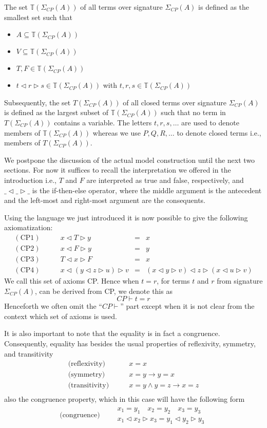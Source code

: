 \documentclass[a4paper,twoside,openright]{report}
\newcommand{\sig}{\ensuremath{\Sigma_{CP}(A)}}
\newcommand{\CP}[1]{\ensuremath{\mathrm{CP#1}}}
\newcommand{\lef}{\ensuremath{\triangleleft}}
\newcommand{\rig}{\ensuremath{\triangleright}}
\begin{document}
The set $\mathbb{T}(\sig)$ of all terms over signature $\sig$ is defined as the smallest set such that
\begin{itemize}
\item $A\subseteq \mathbb{T}(\sig)$
\item $V\subseteq \mathbb{T}(\sig)$
\item $T,F\in \mathbb{T}(\sig)$
\item $t\lef r\rig s\in \mathbb{T}(\sig)$ with $t,r,s\in\mathbb{T}(\sig)$
\end{itemize}
Subsequently, the set $T(\sig)$ of all closed terms over signature $\sig$ is defined as the largest subset of $\mathbb{T}(\sig)$ such that no term in $T(\sig)$ contains a variable. The letters $t, r, s,\ldots$ are used to denote members of $\mathbb{T}(\sig)$ whereas we use $P, Q, R,\ldots$ to denote closed terms i.e., members of $T(\sig)$.

We postpone the discussion of the actual model construction until the next two sections. For now it suffices to recall the interpretation we offered in the introduction i.e., $T$ and $F$ are interpreted as true and false, respectively, and $\_\lef\_\rig\_$ is the if-then-else operator, where the middle argument is the antecedent and the left-most and right-most argument are the consequents.





Using the language we just introduced it is now possible to give the following axiomatization:
\[
\begin{array}{lrcl}
(\CP1)\qquad& x\lef T\rig y &=&x\\
(\CP2)\qquad& x\lef F\rig y &=&y\\
(\CP3)\qquad& T\lef x\rig F &=&x\\
(\CP4)\qquad& x\lef(y\lef z\rig u)\rig v &=& (x\lef y\rig v)\lef z\rig(x\lef u\rig v)
\end{array}
\]
We call this set of axioms CP. Hence when $t=r$, for terms $t$ and $r$ from signature \sig, can be derived from CP, we denote this as
\[
CP\vdash t=r
\]
Henceforth we often omit the ``$CP\vdash$'' part except when it is not clear from the context which set of axioms is used.

It is also important to note that the equality is in fact a congruence. Consequently, equality has besides the usual properties of reflexivity, symmetry, and transitivity
\[
\begin{array}{ll}
\text{(reflexivity)}\qquad & x = x\\
\text{(symmetry)}\qquad & x = y \rightarrow y=x\\
\text{(transitivity)}\qquad & x=y\wedge y=z \rightarrow x=z\\
\end{array}
\]
also the congruence property, which in this case will have the following form
\[
\begin{array}{lrcl}
\text{(congruence)}\qquad
\begin{array}{c}
x_1=y_1\quad x_2=y_2\quad x_3=y_3\\
\hline
x_1\lef x_2\rig x_3 = y_1\lef y_2\rig y_3
\end{array}
\end{array}
\]
\end{document}
